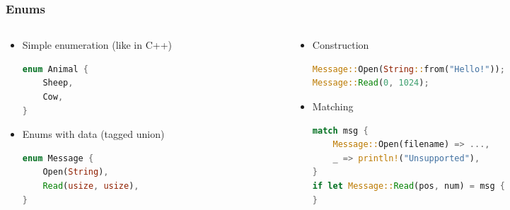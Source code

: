 \begin{frame}[fragile]
    \frametitle{Enums}

    \begin{columns}
    \begin{column}{0.5\textwidth}

    \begin{itemize}
        \item<1-> Simple enumeration (like in C++)
        \begin{lstlisting}[language=rust]
enum Animal {
    Sheep,
    Cow,
}
        \end{lstlisting}

        \item<2-> Enums with data (tagged union)
        \begin{lstlisting}[language=rust]
enum Message {
    Open(String),
    Read(usize, usize),
}
        \end{lstlisting}
    \end{itemize}

    \end{column}
    \begin{column}{0.5\textwidth}

    \begin{itemize}
        \item<3-> Construction
        \begin{lstlisting}[language=rust]
Message::Open(String::from("Hello!"));
Message::Read(0, 1024);
        \end{lstlisting}

        \item<4-> Matching
        \begin{lstlisting}[language=rust]
match msg {
    Message::Open(filename) => ...,
    _ => println!("Unsupported"),
}
if let Message::Read(pos, num) = msg {
}
        \end{lstlisting}
    \end{itemize}

    \end{column}
    \end{columns}
\end{frame}
